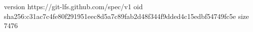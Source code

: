 version https://git-lfs.github.com/spec/v1
oid sha256:c31ac7c4fe80f291951eec8d5a7c89fab2d48f344f9dded4c15edbf54749fc5e
size 7476
